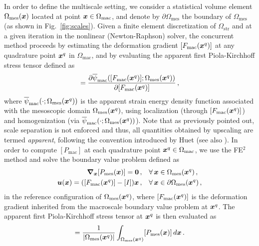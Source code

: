 In order to define the multiscale setting, we consider a statistical volume element $\Omega_\text{mes}({\boldsymbol{x}})$ located at point ${\boldsymbol{x}} \in \Omega_\text{mac}$, and denote by $\partial \Omega_\text{mes}$ the boundary of $\Omega_\text{mes}$ (as shown in Fig.~\ref{fig:scales}). Given a finite element discretization of $\Omega_\text{str}$ and at a given iteration in the nonlinear (Newton-Raphson) solver, the concurrent method proceeds by estimating the deformation gradient $[F_\text{mac}({\boldsymbol{x}}^{q})]$ at any quadrature point ${\boldsymbol{x}}^{q}$ in $\Omega_\text{mac}$, and by evaluating the apparent first Piola-Kirchhoff stress tensor defined as
\begin{equation}
    [P_\text{mac}(\bfx^{q})] = \frac{\partial \overline{\psi}_\text{mac}([F_\text{mac}(\bfx^{q})]; \Omega_\text{mes}(\bfx^{q}))}{\partial [F_\text{mac}(\bfx^{q})]}\,,
\end{equation}
where $\overline{\psi}_\text{mac}(\cdot; \Omega_\text{mes}({\boldsymbol{x}}^{q}))$ is the apparent strain energy density function associated with the mesoscopic domain $\Omega_\text{mes}({\boldsymbol{x}}^{q})$, using localization (through $[F_\text{mac}({\boldsymbol{x}}^{q})]$) and homogenization (via $\overline{\psi}_\text{mac}(\cdot; \Omega_\text{mes}({\boldsymbol{x}}^{q}))$). Note that as previously pointed out, scale separation is not enforced and thus, all quantities obtained by upscaling are termed \textit{apparent}, following the convention introduced by Huet \cite{HUET1990813} (see also \cite{book-ostoja}). In order to compute $[P_\text{mac}]$ at each quadrature point ${\boldsymbol{x}}^{q} \in \Omega_\text{mac}$, we use the FE$^2$ method \cite{feyel2000fe2, feyel2003multilevel} and solve the boundary value problem defined as
\begin{align}
    \boldsymbol{\nabla}_{{\boldsymbol{x}}} [P_\text{mes}({\boldsymbol{x}})] = {\mathbf{0}}\,,& \quad \forall\,{\boldsymbol{x}} \in \Omega_\text{mes}({\boldsymbol{x}}^{q})\,,\\
    {\boldsymbol{u}}({\boldsymbol{x}}) = ([F_\text{mac}({\boldsymbol{x}}^{q})] - [I]) {\boldsymbol{x}} \,,& \quad \forall\, {\boldsymbol{x}} \in \partial \Omega_\text{mes}({\boldsymbol{x}}^{q})\,,
\end{align}
in the reference configuration of $\Omega_\text{mes}({\boldsymbol{x}}^{q})$, where $[F_\text{mac}({\boldsymbol{x}}^{q})]$ is the deformation gradient inherited from the macroscale boundary value problem at ${\boldsymbol{x}}^{q}$. The apparent first Piola-Kirchhoff stress tensor at ${\boldsymbol{x}}^{q}$ is then evaluated as \cite{hill1972constitutive}
\begin{align}
    [P_\text{mac}(\bfx^{q})] = \frac{1}{\vert\Omega_\text{mes}(\bfx^{q})\vert} \int_{\Omega_\text{mes}(\bfx^{q})} [P_\text{mes}(\bfx)]\,d\bfx\,.
\end{align}
